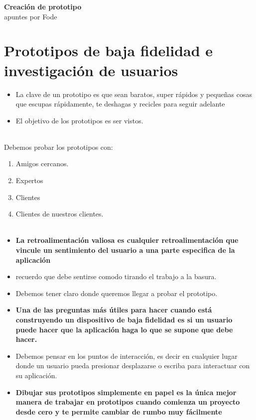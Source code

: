 \documentclass[10pt]{article}
\begin{document}
\begin{center} 
    \Huge \textbf{Creación de prototipo}\\
    \vspace{.5cm}
    \normalsize apuntes por Fode
\end{center}

\begin{flushleft}
\end{flushleft}

\section*{Prototipos de baja fidelidad e investigación de usuarios}

    \begin{itemize}
        \item La clave de un prototipo es que  sean baratos, super rápidos y pequeñas cosas que escupas rápidamente, te deshagas y recicles para seguir adelante
        \item El objetivo de los prototipos es ser vistos.\\\\
    \end{itemize}

    Debemos probar los prototipos con:

    \begin{enumerate}[\bfseries 1.]
        \item Amigos cercanos.
        \item Expertos
        \item Clientes
        \item Clientes de nuestros clientes. \\\\
    \end{enumerate}

    \begin{itemize}
        \item \textbf{La retroalimentación valiosa es cualquier retroalimentación que vincule un sentimiento del usuario a una parte especifica de la aplicación}
        \item recuerdo que debe sentirse comodo tirando el trabajo a la basura.
        \item Debemos tener claro donde queremos llegar a probar el prototipo.
        \item \textbf{Una de las preguntas más útiles para hacer cuando está construyendo un dispositivo de baja fidelidad es si un usuario puede hacer que la aplicación haga lo que se supone que debe hacer.}
        \item Debemos pensar en los puntos de interacción, es decir en cualquier lugar donde un usuario pueda presionar desplazarse o escriba para interactuar con su aplicación.
        \item \textbf{Dibujar sus prototipos simplemente en papel es la única mejor manera de trabajar en prototipos cuando comienza un proyecto desde cero y te permite cambiar de rumbo muy fácilmente} 
    \end{itemize}
\end{document}
